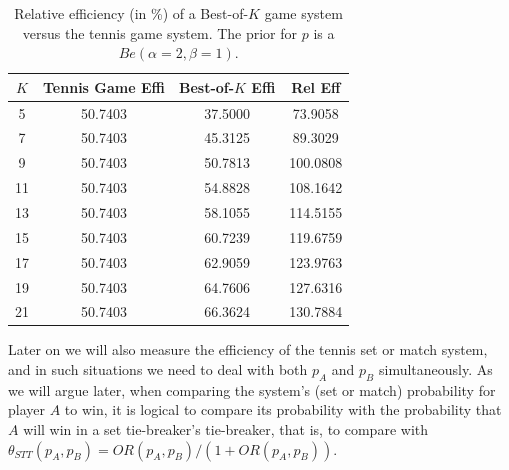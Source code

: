 \documentclass[11pt]{article}
\theoremstyle{plain}
\theoremstyle{definition}
\newcommand{\RED}[1]{{\color{red} #1}}
\begin{document}
{\begin{table}
\begin{center}
\begin{tabular}{cccc} \hline
  $K$ & Tennis Game Effi & Best-of-$K$ Effi & Rel Eff \\ \hline
    5   &       50.7403   &   37.5000 & 73.9058 \\
   7     &     50.7403    &  45.3125  & 89.3029 \\
   9     &     50.7403   &   50.7813 & 100.0808 \\
  11      &    50.7403    &  54.8828 & 108.1642 \\
   13     &     50.7403   &   58.1055 & 114.5155 \\
   15     &     50.7403   &   60.7239 & 119.6759 \\
  17     &     50.7403   &   62.9059  & 123.9763 \\
   19    &      50.7403  &    64.7606 & 127.6316 \\
   21    &      50.7403  &    66.3624 & 130.7884
 \\ \hline
\end{tabular}
\end{center}
\caption{Relative efficiency (in \%) of a Best-of-$K$ game system versus the tennis game system. The prior for $p$ is a $Be(\alpha=2,\beta=1)$.}
\label{tab: relative efficiency for game systems}
\end{table}

Later on we will also measure the \RED{efficiency of the tennis set or match system}, and in such situations we need to deal with both $p_A$ and $p_B$ simultaneously. As we will argue later, when comparing the system's (set or match) probability for player $A$ to win, it is logical to compare its probability with the probability that $A$ will win in a set tie-breaker's tie-breaker, that is, to compare with $\theta_{STT}(p_A,p_B) = OR(p_A,p_B)/(1 + OR(p_A,p_B))$.

}
\end{document}
